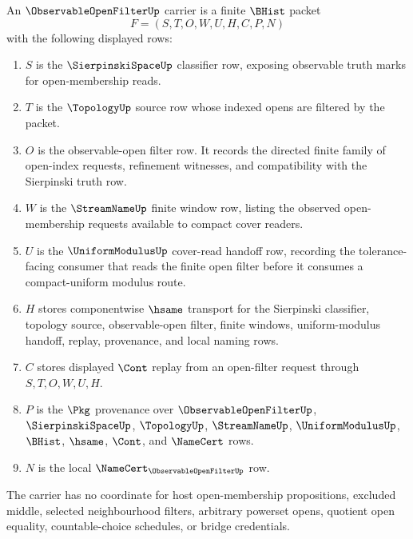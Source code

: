 \begin{definition}
\label{def:observable-open-filter-carrier}
An $\ObservableOpenFilterUp$ carrier is a finite $\BHist$ packet
$$
F=(S,T,O,W,U,H,C,P,N)
$$
with the following displayed rows:
\begin{enumerate}
\item $S$ is the $\SierpinskiSpaceUp$ classifier row, exposing observable truth marks for open-membership reads.
\item $T$ is the $\TopologyUp$ source row whose indexed opens are filtered by the packet.
\item $O$ is the observable-open filter row. It records the directed finite family of open-index requests, refinement witnesses, and compatibility with the Sierpinski truth row.
\item $W$ is the $\StreamNameUp$ finite window row, listing the observed open-membership requests available to compact cover readers.
\item $U$ is the $\UniformModulusUp$ cover-read handoff row, recording the tolerance-facing consumer that reads the finite open filter before it consumes a compact-uniform modulus route.
\item $H$ stores componentwise $\hsame$ transport for the Sierpinski classifier, topology source, observable-open filter, finite windows, uniform-modulus handoff, replay, provenance, and local naming rows.
\item $C$ stores displayed $\Cont$ replay from an open-filter request through $S,T,O,W,U,H$.
\item $P$ is the $\Pkg$ provenance over $\ObservableOpenFilterUp$, $\SierpinskiSpaceUp$, $\TopologyUp$, $\StreamNameUp$, $\UniformModulusUp$, $\BHist$, $\hsame$, $\Cont$, and $\NameCert$ rows.
\item $N$ is the local $\NameCert_{\ObservableOpenFilterUp}$ row.
\end{enumerate}
The carrier has no coordinate for host open-membership propositions, excluded middle, selected neighbourhood filters, arbitrary powerset opens, quotient open equality, countable-choice schedules, or bridge credentials.
\end{definition}

